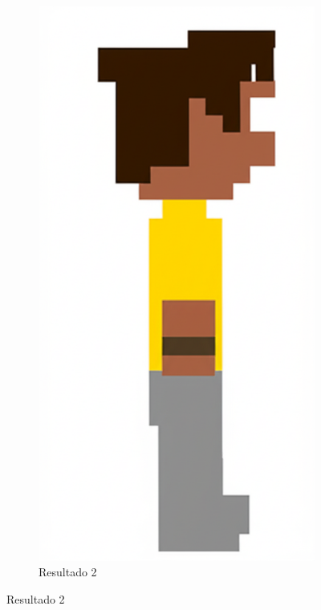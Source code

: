\begin{figure}[htbp]
\begin{subfigure}{0.23\linewidth}
        \includegraphics[width=1\linewidth]{figs/geminiPro/chat2/res2_tela3.png}
        \caption{\small Resultado 2}
        \label{fig:geminiPro6b}
    \end{subfigure}
\end{figure}

